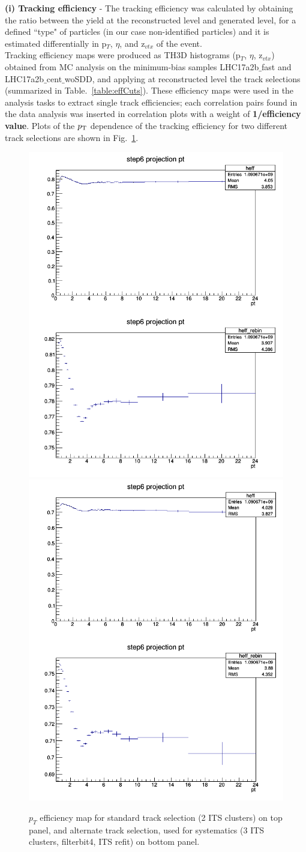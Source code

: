 {\bf \normalsize (i) Tracking efficiency} - The tracking efficiency was calculated by obtaining the ratio between the yield at the reconstructed level and generated level, for a defined ``type" of particles (in our case non-identified particles) and it is estimated differentially in p$_T$, $\eta$, and z$_{vtx}$ of the event.\\

Tracking efficiency maps were produced as TH3D histograms (p$_T$, $\eta$, z$_{vtx}$) obtained from MC analysis on the minimum-bias samples LHC17a2b$\_$fast and LHC17a2b$\_$cent$\_$woSDD, and applying at reconstructed level the track selections (summarized in Table.~\ref{table:effCuts}). These efficiency maps were used in the analysis tasks to extract single track efficiencies; each correlation pairs found in the data analysis was inserted in correlation plots with a weight of {\bf 1/efficiency value}.  Plots of the $p_{\rm T}$ dependence of the tracking efficiency for two different track selections are shown in Fig.~\ref{fig:trackeff}.

\begin{figure}[h]
	\centering
	\includegraphics[width=.48\linewidth]{figures/Effs/TrackEfficiency_pPb2016_defaultCuts.png}
    \includegraphics[width=.48\linewidth]{figures/Effs/TrackEfficiency_pPb2016_Min3ITSCls.png}
	\caption{$p_T$ efficiency map for standard track selection (2 ITS clusters) on top panel, and alternate track selection, used for systematics (3 ITS clusters, filterbit4, ITS refit) on bottom panel.}
	\label{fig:trackeff}	
\end{figure}


